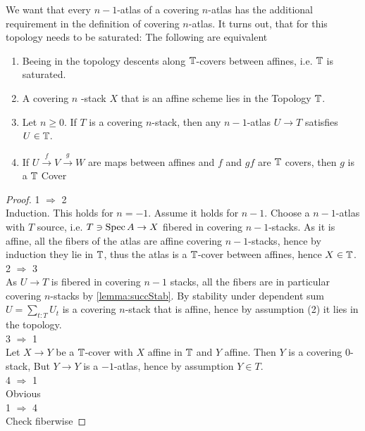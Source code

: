 \documentclass{article}
\begin{document}
\begin{lemma}[1.1]{\label{lemma:coveringatlas}}
We want that every $n-1$-atlas of a covering $n$-atlas has the additional requirement in the definition of covering $n$-atlas. It turns out, that for this topology needs to be saturated:
The following are equivalent
\begin{enumerate}
   
    \item Beeing in the topology descents along $\mathbb{T}$-covers between affines, i.e. $\mathbb{T}$ is saturated.
    \item A covering $n$ -stack $X$ that is an affine scheme lies in the Topology $\mathbb{T}$.  
    \item Let $n \ge 0$. If $T$ is a covering $n$-stack, then any $n-1$-atlas $U \to T$ satisfies $U \in \mathbb{T}$.
     \item If $U \overset{f}{\to} V \overset{g}{\to} W$ are maps between affines and $f$ and $gf$ are $\mathbb{T}$ covers, then $g$ is a $\mathbb{T}$ Cover
\end{enumerate}
\end{lemma}
\begin{proof}
1 $\Rightarrow$ 2 \\
  Induction.
    This holds for $n=-1$. Assume it holds for $n-1$. Choose a $n-1$-atlas with $T$ source, i.e. $T \ni \operatorname{Spec} A \to X$ fibered in covering $n-1$-stacks.  As it is affine, all the fibers of the atlas are affine covering $n-1$-stacks, hence by induction they lie in $\mathbb{T}$, thus the atlas is a $\mathbb{T}$-cover between affines, hence $X \in \mathbb{T}$. \\
    2 $\Rightarrow$ 3 \\
    As $U \to T$ is fibered in covering $n-1$ stacks, all the fibers are in particular covering $n$-stacks by \ref{lemma:succStab}. By stability under dependent sum $U = \sum_{t : T} U_t$ is a covering $n$-stack that is affine, hence by assumption (2) it lies in the topology.\\
3 $\Rightarrow$ 1 \\
Let $X \to Y$ be a $\mathbb{T}$-cover with $X$ affine in $\mathbb{T}$ and $Y$ affine. Then $Y$ is a covering $0$-stack, But $Y \to Y$ is a $-1$-atlas, hence by assumption $Y \in T$. 
\\
4 $\Rightarrow$ 1 \\
Obvious
\\
1 $\Rightarrow$ 4 \\
Check fiberwise
\end{proof}
\end{document}
